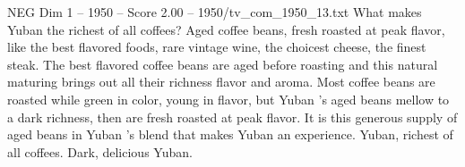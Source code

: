 \begin{textsample}{NEG Dim 1 – 1950 – Score 2.00 – 1950/tv\_com\_1950\_13.txt}  \label{ex:f1_neg_086}
What makes Yuban the richest of all coffees?
Aged coffee beans, fresh roasted at peak flavor, like the best flavored foods, rare vintage wine, the choicest cheese, the finest steak.
The best flavored coffee beans are aged before roasting and this natural maturing brings out all their richness flavor and aroma.
Most coffee beans are roasted while green in color, young in flavor, but Yuban 's aged beans mellow to a dark richness, then are fresh roasted at peak flavor.
It is this generous supply of aged beans in Yuban 's blend that makes Yuban an experience.
Yuban, richest of all coffees.
Dark, delicious Yuban.

\end{textsample}
